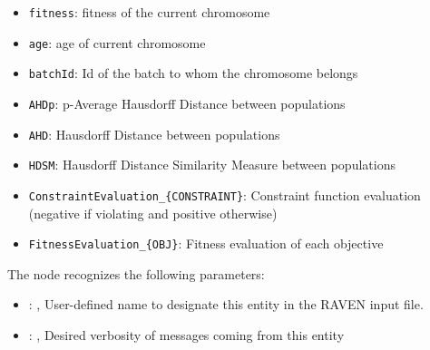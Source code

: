 \begin{itemize}
             \item \texttt{fitness}: fitness of the current chromosome
             \item \texttt{age}: age of current chromosome
             \item \texttt{batchId}: Id of the batch to whom the chromosome belongs
             \item \texttt{AHDp}: p-Average Hausdorff Distance between populations
             \item \texttt{AHD}: Hausdorff Distance between populations
             \item \texttt{HDSM}: Hausdorff Distance Similarity Measure between populations
             \item \texttt{ConstraintEvaluation\_\{CONSTRAINT\}}: Constraint function evaluation (negative if violating and positive otherwise)
             \item \texttt{FitnessEvaluation\_\{OBJ\}}: Fitness evaluation of each objective

         \end{itemize}

  The  node recognizes the following parameters:
    \begin{itemize}
      \item {}: ,
        User-defined name to designate this entity in the RAVEN input file.
      \item {}: ,
        Desired verbosity of messages coming from this entity
  \end{itemize}

